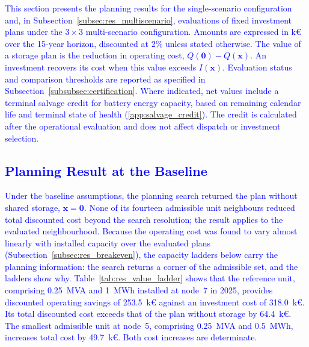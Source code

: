 \documentclass[preprint,12pt]{elsarticle}
\begin{document}
\textcolor{blue}{
    This section presents the planning results for the single-scenario configuration and, in Subsection~\ref{subsec:res_multiscenario}, evaluations of fixed investment plans under the $3 \times 3$ multi-scenario configuration. Amounts are expressed in k\euro{} over the 15-year horizon, discounted at 2\% unless stated otherwise.
    The value of a storage plan is the reduction in operating cost, $Q(\boldsymbol{0}) - Q(\boldsymbol{x})$. An investment recovers its cost when this value exceeds $I(\boldsymbol{x})$. Evaluation status and comparison thresholds are reported as specified in Subsection~\ref{subsubsec:certification}.
    Where indicated, net values include a terminal salvage credit for battery energy capacity, based on remaining calendar life and terminal state of health (\ref{app:salvage_credit}). The credit is calculated after the operational evaluation and does not affect dispatch or investment selection.
}


\subsection{\textcolor{blue}{Planning Result at the Baseline}}
\label{subsec:res_baseline}

\textcolor{blue}{
    Under the baseline assumptions, the planning search returned the plan without shared storage, $\boldsymbol{x}=\boldsymbol{0}$.
    None of its fourteen admissible unit neighbours reduced total discounted cost beyond the search resolution; the result applies to the evaluated neighbourhood. Because the operating cost was found to vary almost linearly with installed capacity over the evaluated plans (Subsection~\ref{subsec:res_breakeven}), the capacity ladders below carry the planning information: the search returns a corner of the admissible set, and the ladders show why.
    Table~\ref{tab:res_value_ladder} shows that the reference unit, comprising 0.25~MVA and 1~MWh installed at node~7 in 2025, provides discounted operating savings of 253.5~k\euro{} against an investment cost of 318.0~k\euro{}. Its total discounted cost exceeds that of the plan without storage by 64.4~k\euro{}. The smallest admissible unit at node~5, comprising 0.25~MVA and 0.5~MWh, increases total cost by 49.7~k\euro{}. Both cost increases are determinate.
}
\end{document}
